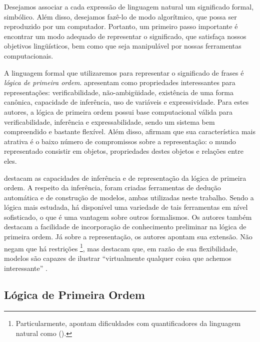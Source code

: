 



%
Desejamos associar a cada expressão de linguagem natural um significado formal, simbólico. Além disso, desejamos fazê-lo de modo algorítmico, que possa ser reproduzido por um computador. Portanto, um primeiro passo importante é encontrar um modo adequado de representar o significado, que satisfaça nossos objetivos lingüísticos, bem como que seja manipulável por nossas ferramentas computacionais.

A linguagem formal que utilizaremos para representar o significado de frases é \textit{lógica de primeira ordem}. \citet[pp.~500--506]{Jurafsky:2009} apresentam como propriedades interessantes para representações: verificabilidade, não-ambigüidade, existência de uma forma canônica, capacidade de inferência, uso de variáveis e expressividade. Para estes autores, a lógica de primeira ordem possui base computacional válida para verificabilidade, inferência e expressabilidade, sendo um sistema bem compreendido e bastante flexível. Além disso, afirmam que sua característica mais atrativa é o baixo número de compromissos sobre a representação: o mundo representado consistir em objetos, propriedades destes objetos e relações entre eles. \citep[p.~509]{Jurafsky:2009}

\citet[pp.~44--50]{BlackburnBos:2005} destacam as capacidades de inferência e de representação da lógica de primeira ordem. A respeito da inferência, foram criadas ferramentas de dedução automática e de construção de modelos, ambas utilizadas neste trabalho. Sendo a lógica mais estudada, há disponível uma variedade de tais ferramentas em nível sofisticado, o que é uma vantagem sobre outros formalismos. Os autores também destacam a facilidade de incorporação de conhecimento preliminar na lógica de primeira ordem. Já sobre a representação, os autores apontam sua extensão. Não negam que há restrições%
	\footnote{Particularmente, apontam dificuldades com quantificadores da linguagem natural como  ().}, 
mas destacam que, em razão de sua flexibilidade, modelos são capazes de ilustrar ``virtualmente qualquer coisa que achemos interessante'' \citep[p.~48]{BlackburnBos:2005}.

\subsection{Lógica de Primeira Ordem}

